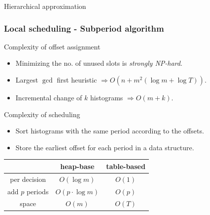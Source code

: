 \documentclass[]{prezentare}
\begin{document}
\begin{frame}
\begin{exampleblock}{Hierarchical approximation}
\begin{center}
	\end{center}	
	\end{exampleblock}
\end{frame}
\begin{frame}
	\frametitle{Local scheduling - Subperiod algorithm}
	\begin{block}{Complexity of offset assignment}
	\begin{itemize}
	\item Minimizing the no. of unused slots is \emph{strongly NP-hard}.
	\item Largest $\gcd$ first heuristic $\Longrightarrow O(n + m^2(\log m + \log T))$.
	\item Incremental change of $k$ histograms $\Longrightarrow O(m + k)$. 
	\end{itemize}
	\end{block}
	
	\begin{block}{Complexity of scheduling}
	\begin{itemize}
	\item Sort histograms with the same period according to the offsets.
	\item Store the earliest offset for each period in a data structure.
	\end{itemize}
	
	\begin{center}
	\begin{tabular}{c | c | c}
                           & heap-base           & table-based \\
   	\hline
 	          per decision & $O(\log m)$         & $O(1)$ \\
   	\hline
 	       add $p$ periods & $O(p \cdot \log m)$ & $O(p)$ \\
   	\hline
                     space & $O(m)$              & $O(T)$ \\
	\end{tabular}
	\end{center}

	\end{block}
\end{frame}
\end{document}
